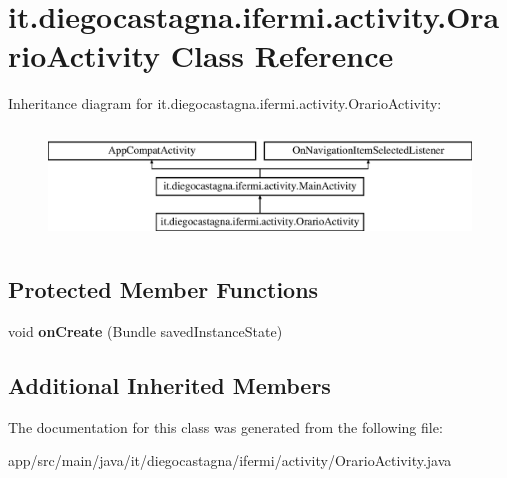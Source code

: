\hypertarget{classit_1_1diegocastagna_1_1ifermi_1_1activity_1_1_orario_activity}{}\section{it.\+diegocastagna.\+ifermi.\+activity.\+Orario\+Activity Class Reference}
\label{classit_1_1diegocastagna_1_1ifermi_1_1activity_1_1_orario_activity}
Inheritance diagram for it.\+diegocastagna.\+ifermi.\+activity.\+Orario\+Activity\+:\begin{figure}[H]
\begin{center}
\leavevmode
\includegraphics[height=3.000000cm]{classit_1_1diegocastagna_1_1ifermi_1_1activity_1_1_orario_activity}
\end{center}
\end{figure}
\subsection*{Protected Member Functions}
\begin{DoxyCompactItemize}
\item 
\mbox{\label{classit_1_1diegocastagna_1_1ifermi_1_1activity_1_1_orario_activity_a0eeb80e5b67c82ca5ea59a13c711969a}} 
void {\bfseries on\+Create} (Bundle saved\+Instance\+State)
\end{DoxyCompactItemize}
\subsection*{Additional Inherited Members}


The documentation for this class was generated from the following file\+:\begin{DoxyCompactItemize}
\item 
app/src/main/java/it/diegocastagna/ifermi/activity/Orario\+Activity.\+java\end{DoxyCompactItemize}
